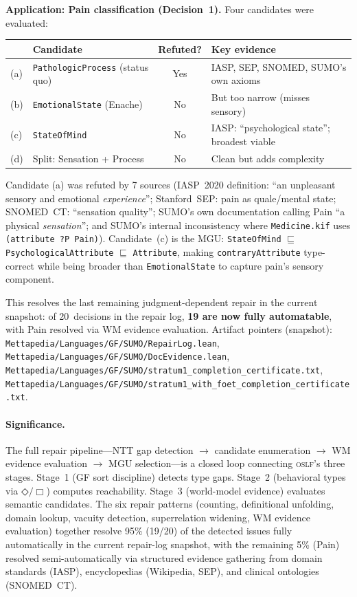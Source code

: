 \documentclass[11pt]{article}
\newcommand{\DiamondOp}{\mathbin{\Diamond}}
\newcommand{\BoxOp}{\mathbin{\Box}}
\newcommand{\OSLF}{\textsc{oslf}}
\theoremstyle{definition}
\theoremstyle{plain}
\begin{document}
\medskip\noindent\textbf{Application: Pain classification (Decision~1).}
Four candidates were evaluated:
\begin{center}\small
\begin{tabular}{@{}llcl@{}}
\toprule
& \textbf{Candidate} & \textbf{Refuted?} & \textbf{Key evidence} \\
\midrule
(a) & \texttt{PathologicProcess} (status quo) & Yes & IASP, SEP, SNOMED, SUMO's own axioms \\
(b) & \texttt{EmotionalState} (Enache) & No & But too narrow (misses sensory) \\
(c) & \texttt{StateOfMind} & No & IASP: ``psychological state''; broadest viable \\
(d) & Split: Sensation + Process & No & Clean but adds complexity \\
\bottomrule
\end{tabular}
\end{center}
Candidate (a) was refuted by 7 sources (IASP~2020 definition:
``an unpleasant sensory and emotional \emph{experience}'';
Stanford~SEP: pain as quale/mental state; SNOMED~CT:
``sensation quality''; SUMO's own documentation calling Pain
``a physical \emph{sensation}''; and SUMO's internal inconsistency
where \texttt{Medicine.kif} uses \texttt{(attribute~?P~Pain)}).
Candidate~(c) is the MGU: \texttt{StateOfMind} $\sqsubseteq$
\texttt{PsychologicalAttribute} $\sqsubseteq$
\texttt{Attribute}, making \texttt{contraryAttribute} type-correct
while being broader than \texttt{EmotionalState} to capture
pain's sensory component.

This resolves the last remaining judgment-dependent repair in the current snapshot:
of 20~decisions in the repair log, \textbf{19 are now fully
automatable}, with Pain resolved via WM evidence evaluation.
Artifact pointers (snapshot): \texttt{Mettapedia/Languages/GF/SUMO/RepairLog.lean},
\texttt{Mettapedia/Languages/GF/SUMO/DocEvidence.lean},
\texttt{Mettapedia/Languages/GF/SUMO/stratum1\_completion\_certificate.txt},
\texttt{Mettapedia/Languages/GF/SUMO/stratum1\_with\_foet\_completion\_certificate.txt}.

\paragraph{Significance.}
The full repair pipeline---NTT gap detection $\to$ candidate
enumeration $\to$ WM evidence evaluation $\to$ MGU selection---is
a closed loop connecting \OSLF{}'s three stages.  Stage~1 (GF sort
discipline) detects type gaps.  Stage~2 (behavioral types via
$\DiamondOp/\BoxOp$) computes reachability.  Stage~3 (world-model
evidence) evaluates semantic candidates.  The six repair patterns
(counting, definitional unfolding, domain lookup, vacuity detection,
superrelation widening, WM evidence evaluation) together resolve
95\% (19/20) of the detected issues fully automatically in the current repair-log
snapshot, with the
remaining 5\% (Pain) resolved semi-automatically via structured
evidence gathering from domain standards (IASP), encyclopedias
(Wikipedia, SEP), and clinical ontologies (SNOMED~CT).
\end{document}
